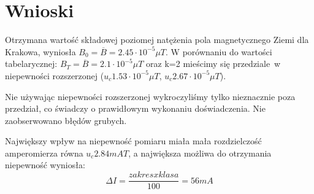 \documentclass{article}
\begin{document}
\section{Wnioski}

Otrzymana wartość składowej poziomej natężenia pola magnetycznego Ziemi dla Krakowa, wyniosła $B_0 = \overline{B} = 2.45 \cdot 10^{-5} \mu T$. W porównaniu do wartości tabelarycznej: $B_T = \overline{B} = 2.1 \cdot 10^{-5} \mu T$ oraz k=2 mieścimy się przedziale w niepewności rozszerzonej ($u_c 1.53 \cdot 10^{-5} \mu T$, $u_c 2.67 \cdot 10^{-5} \mu T$).

Nie używając niepewności rozszerzonej wykroczyliśmy tylko nieznacznie poza przedział, co świadczy o prawidłowym wykonaniu doświadczenia. Nie zaobserwowano błędów grubych.

Największy wpływ na niepewność pomiaru miała mała rozdzielczość amperomierza równa $u_c 2.84 mA T$, a największa możliwa do otrzymania niepewność wyniosła: \begin{equation}
\Delta I = \frac{zakres x klasa}{100} = 56 mA
\end{equation}





\end{document}

